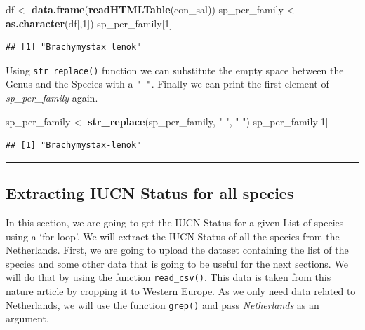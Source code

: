 \documentclass[
]{book}
\newenvironment{Shaded}{\begin{snugshade}}{\end{snugshade}}
\newcommand{\DecValTok}[1]{\textcolor[rgb]{0.00,0.00,0.81}{#1}}
\newcommand{\KeywordTok}[1]{\textcolor[rgb]{0.13,0.29,0.53}{\textbf{#1}}}
\newcommand{\NormalTok}[1]{#1}
\newcommand{\StringTok}[1]{\textcolor[rgb]{0.31,0.60,0.02}{#1}}
\begin{document}
\begin{Shaded}
\begin{Highlighting}[]
\NormalTok{df <-}\StringTok{ }\KeywordTok{data.frame}\NormalTok{(}\KeywordTok{readHTMLTable}\NormalTok{(con_sal))}
\NormalTok{sp_per_family <-}\StringTok{ }\KeywordTok{as.character}\NormalTok{(df[,}\DecValTok{1}\NormalTok{])}
\NormalTok{sp_per_family[}\DecValTok{1}\NormalTok{]}
\end{Highlighting}
\end{Shaded}

\begin{verbatim}
## [1] "Brachymystax lenok"
\end{verbatim}

Using \texttt{str\_replace()} function we can substitute the empty space between the Genus and the Species with a \texttt{"-"}. Finally we can print the first element of \emph{sp\_per\_family} again.

\begin{Shaded}
\begin{Highlighting}[]
\NormalTok{sp_per_family <-}\StringTok{ }\KeywordTok{str_replace}\NormalTok{(sp_per_family, }\StringTok{" "}\NormalTok{, }\StringTok{"-"}\NormalTok{)}
\NormalTok{sp_per_family[}\DecValTok{1}\NormalTok{]}
\end{Highlighting}
\end{Shaded}

\begin{verbatim}
## [1] "Brachymystax-lenok"
\end{verbatim}

\begin{center}\rule{0.5\linewidth}{0.5pt}\end{center}

\hypertarget{extracting-iucn-status-for-all-species}{%
\subsection{Extracting IUCN Status for all species}\label{extracting-iucn-status-for-all-species}}

In this section, we are going to get the IUCN Status for a given List of species using a `for loop'. We will extract the IUCN Status of all the species from the Netherlands.
First, we are going to upload the dataset containing the list of the species and some other data that is going to be useful for the next sections. We will do that by using the function \texttt{read\_csv()}. This data is taken from this \href{https://www.nature.com/articles/sdata2017141}{nature article} by cropping it to Western Europe. As we only need data related to Netherlands, we will use the function \texttt{grep()} and pass \emph{Netherlands} as an argument.
\end{document}
